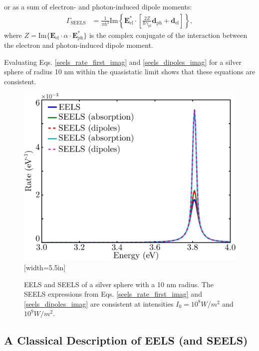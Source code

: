 \documentclass [11pt, proquest] {uwthesis}[2016/11/22]
\begin{document}
or as a sum of electron- and photon-induced dipole moments:
\begin{equation}
\begin{aligned}
\Gamma_{\textrm{SEELS}} &= \frac{1}{\pi\hbar^2}\textrm{Im}\left\{\textbf{E}_{\textrm{el}}^*\cdot\left[\frac{2Z}{\hbar\gamma_{\textrm{pl}}}\textbf{d}_{\textrm{ph}} + \textbf{d}_{\textrm{el}}\right]\right\},
  \label{seels_dipoles_imag}
\end{aligned}
\end{equation}
where $Z=\textrm{Im}\{\textbf{E}_{\textrm{el}}\cdot\alpha\cdot\textbf{E}_{\textrm{ph}}^*\}$ is the complex conjugate of the interaction between the electron and photon-induced dipole moment.

Evaluating Eqs. \ref{seels_rate_first_imag} and \ref{seels_dipoles_imag} for a silver sphere of radius 10 nm within the quasistatic limit shows that these equations are consistent.

\begin{figure}
\begin{centering}
\includegraphics{seels_for_defense.pdf}[width=5.5in]
\caption{EELS and SEELS of a silver sphere with a 10 nm radius. The SEELS expressions from Eqs. \ref{seels_rate_first_imag} and \ref{seels_dipoles_imag} are consistent at intensities $I_0 = 10^{8} W/m^2$ and $10^9 W/m^2$.}
\label{seels_comparison}
\end{centering}
\end{figure}

\subsection{A Classical Description of EELS (and SEELS)}
\end{document}
